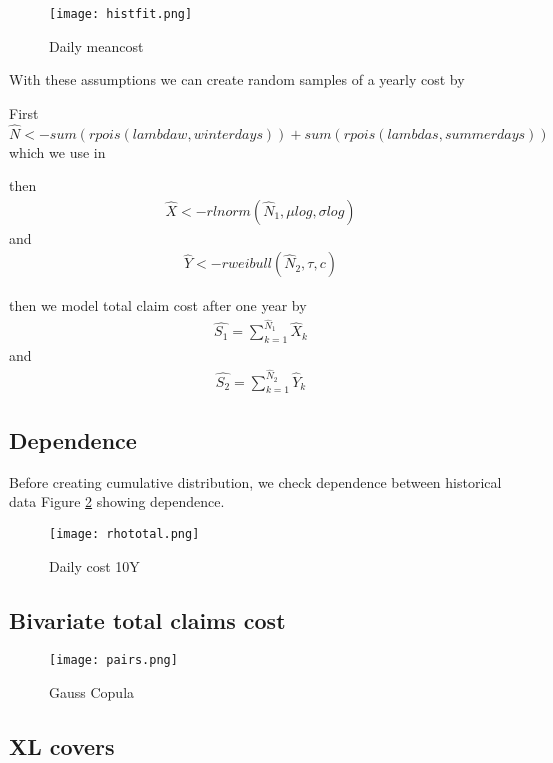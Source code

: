 \documentclass[11pt]{article}
\begin{document}
 \begin{figure}[H]
 \center
  \texttt{[image: histfit.png]}
  \caption{Daily meancost}
  \label{fig:samplefig3}
\end{figure}

With these assumptions we can 
 create random samples of a yearly cost by

First $\hat{N} <-  sum(rpois(lambdaw,winterdays)) +  sum(rpois(lambdas,summerdays))$
which we use in

then
\begin{align} \label{eq:sum1}
	\hat{X} <- rlnorm(\hat{N}_1,\mu log,\sigma log) 
\end{align}
and
\begin{align} \label{eq:sum2}
	 \hat{Y} <- rweibull(\hat{N}_2,\tau,c)
\end{align}


then we model total claim cost after one year by
\begin{align} \label{eq:sum1}
	\hat{S_1} = \sum_{k=1}^{\hat{N}_1} \hat{ X}_k   
\end{align}
and
\begin{align} \label{eq:sum2}
	 \hat{S_2} = \sum_{k=1}^{\hat{N}_2} \hat{Y}_k
\end{align}


\subsection*{Dependence}
Before creating cumulative distribution, we check dependence between historical data
 Figure \ref{fig:samplefig4} showing dependence.


 \begin{figure}[H]
 \center
  \texttt{[image: rhototal.png]}
  \caption{Daily cost 10Y}
  \label{fig:samplefig4}
\end{figure}


\subsection*{Bivariate total claims cost}


 \begin{figure}[H]
 \center
  \texttt{[image: pairs.png]}
  \caption{Gauss Copula}
  \label{fig:samplefig5}
\end{figure}

\subsection*{XL covers}
\end{document}
